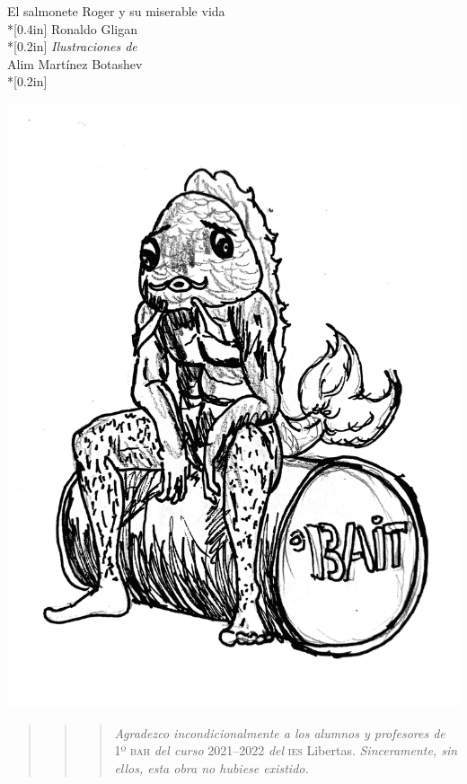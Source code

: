\documentclass[letterpaper,11pt]{report}
\begin{document}

\begin{center}
{\Large El salmonete Roger y su miserable vida}\\*[0.4in]
Ronaldo Gligan\\*[0.2in]
\textit{Ilustraciones de} \\ Alim Martínez Botashev\\*[0.2in]

\includegraphics[scale=0.13]{1}

\pagebreak
\end{center}


\vspace*{\fill}

\begin{quote}\begin{quote}\begin{quote}%
\begin{flushleft}
    \textit{Agradezco incondicionalmente a los alumnos y profesores de} 1º \textsc{bah} \textit{del curso} 2021--2022 \textit{del} \textsc{ies} Libertas. \textit{Sinceramente, sin ellos, esta obra no hubiese existido.}
\end{flushleft}
\end{quote}\end{quote}\end{quote}%
\end{document}
